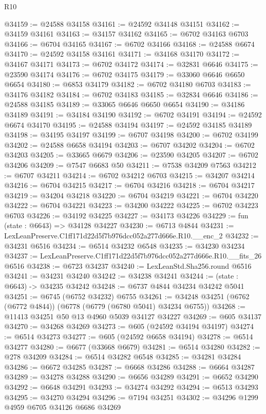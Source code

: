 \begin{lexlean}{R10}
\begin{coremodule}
@34159 := @24588 @34158
@34161 := @24592 @34148 @34151
@34162 := @34159 @34161
@34163 := @34157 @34162
@34165 := @6702 @34163 @6703
@34166 := @6704 @34165
@34167 := @6702 @34166
@34168 := @24588 @6674
@34170 := @24592 @34158 @34161
@34171 := @34168 @34170
@34172 := @34167 @34171
@34173 := @6702 @34172
@34174 := @32831 @6646
@34175 := @23590 @34174
@34176 := @6702 @34175
@34179 := @33060 @6646 @6650 @6654
@34180 := @6853 @34179
@34182 := @6702 @34180 @6703
@34183 := @34176 @34182
@34184 := @6702 @34183
@34185 := @32834 @6646
@34186 := @24588 @34185
@34189 := @33065 @6646 @6650 @6654
@34190 := @34186 @34189
@34191 := @34184 @34190
@34192 := @6702 @34191
@34194 := @24592 @6674 @34170
@34195 := @24588 @34194
@34197 := @24592 @34185 @34189
@34198 := @34195 @34197
@34199 := @6707 @34198
@34200 := @6702 @34199
@34202 := @24588 @6658 @34194
@34203 := @6707 @34202
@34204 := @6702 @34203
@34205 := @33665 @6679
@34206 := @23590 @34205
@34207 := @6702 @34206
@34209 := @7547 @6683 @50
@34211 := @7538 @34209 @7563
@34212 := @6707 @34211
@34214 := @6702 @34212 @6703
@34215 := @34207 @34214
@34216 := @6704 @34215
@34217 := @6704 @34216
@34218 := @6704 @34217
@34219 := @34204 @34218
@34220 := @6704 @34219
@34221 := @6704 @34220
@34222 := @6704 @34221
@34223 := @34200 @34222
@34225 := @6702 @34223 @6703
@34226 := @34192 @34225
@34227 := @34173 @34226
@34229 := fun (state : @6643) => @34128 @34227
@34230 := @6713 @4844
@34231 := LexLeanPreserve.C1ff171d22d5f7b976dcc052a277d666e.R10.__enc_2
@34232 := @34231 @6516
@34234 := @6514 @34232 @6548
@34235 := @34230 @34234
@34237 := LexLeanPreserve.C1ff171d22d5f7b976dcc052a277d666e.R10.__fits_26 @6516
@34238 := @6723 @34237
@34240 := LexLeanStd.Sha256.round @6516
@34241 := @34231 @34240
@34242 := @34238 @34241
@34244 := (state : @6643) -> @34235 @34242
@34248 := @6737 @4844 @34234 @34242 @5041
@34251 := @6745 (@6752 @34232) @6755
@34261 := @34248 @34251 (@6762 (@6772 @4844)) (@6778 (@6779 (@6780 @5041) @34234 @6755))
@34268 := @11413 @34251 @50 @13 @4960 @5039 @34127 @34227
@34269 := @605 @34137
@34270 := @34268 @34269
@34273 := @605 (@24592 @34194 @34197)
@34274 := @6514 @34273
@34277 := @605 (@24592 @6658 @34194)
@34278 := @6514 @34277
@34280 := @6677 (@33668 @6679)
@34281 := @6514 @34280
@34282 := @278 @34209
@34284 := @6514 @34282 @6548
@34285 := @34281 @34284
@34286 := @6672 @34285
@34287 := @6668 @34286
@34288 := @6664 @34287
@34289 := @34278 @34288
@34290 := @6656 @34289
@34291 := @6652 @34290
@34292 := @6648 @34291
@34293 := @34274 @34292
@34294 := @6513 @34293
@34295 := @34270 @34294
@34296 := @7194 @34251
@34302 := @34296 @1299 @4959 @6705 @34126 @6686 @34269

\end{coremodule}
\end{lexlean}
